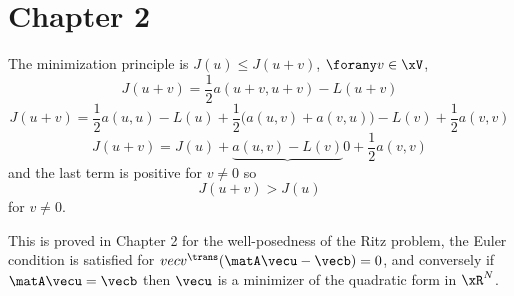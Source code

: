 
\section{Chapter 2}

\begin{tmasltn}{2.1}
\begin{tmatsks}
\item The minimization principle is $J(u) \leq J(u+v)$, $\forany v \in \xV$,
\begin{equation*}
J(u+v) = \frac{1}{2} a(u + v,u + v) - L(u + v)
\end{equation*}
\begin{equation*}
J(u+v) = \frac{1}{2} a(u,u) - L(u) + \frac{1}{2} \bigr(a(u, v)+a(v, u)\bigr) - L(v) + \frac{1}{2} a(v,v)
\end{equation*}
\begin{equation*}
J(u+v) = J(u) + \underbrace{a(u,v) - L(v)}{0} + \frac{1}{2} a(v,v)
\end{equation*}
and the last term is positive for $v\neq 0$ so
\begin{equation*}
J(u+v) > J(u)
\end{equation*}
for $v\neq0$.
\item This is proved in Chapter 2 for the well-posedness of the Ritz problem, the Euler condition is satisfied for $vecv^\trans (\matA\vecu - \vecb) = 0$, and conversely if $\matA\vecu = \vecb$ then $\vecu$ is a minimizer of the quadratic form in $\xR^N$.
\end{tmatsks}
\end{tmasltn}

